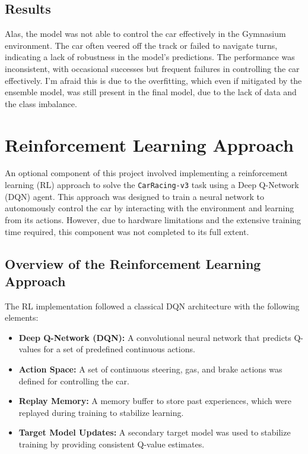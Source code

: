 \documentclass{article}
\begin{document}
\subsection{Results}

Alas, the model was not able to control the car effectively in the Gymnasium environment. The car often veered off the track or failed to navigate turns, indicating a lack of robustness in the model's predictions. The performance was inconsistent, with occasional successes but frequent failures in controlling the car effectively. I'm afraid this is due to the overfitting, which even if mitigated by the ensemble model, was still present in the final model, due to the lack of data and the class imbalance.

\section{Reinforcement Learning Approach}

An optional component of this project involved implementing a reinforcement learning (RL) approach to solve the \texttt{CarRacing-v3} task using a Deep Q-Network (DQN) agent. This approach was designed to train a neural network to autonomously control the car by interacting with the environment and learning from its actions. However, due to hardware limitations and the extensive training time required, this component was not completed to its full extent.

\subsection{Overview of the Reinforcement Learning Approach}

The RL implementation followed a classical DQN architecture with the following elements:
\begin{itemize}
    \item \textbf{Deep Q-Network (DQN):} A convolutional neural network that predicts Q-values for a set of predefined continuous actions.
    \item \textbf{Action Space:} A set of continuous steering, gas, and brake actions was defined for controlling the car.
    \item \textbf{Replay Memory:} A memory buffer to store past experiences, which were replayed during training to stabilize learning.
    \item \textbf{Target Model Updates:} A secondary target model was used to stabilize training by providing consistent Q-value estimates.
\end{itemize}
\end{document}

